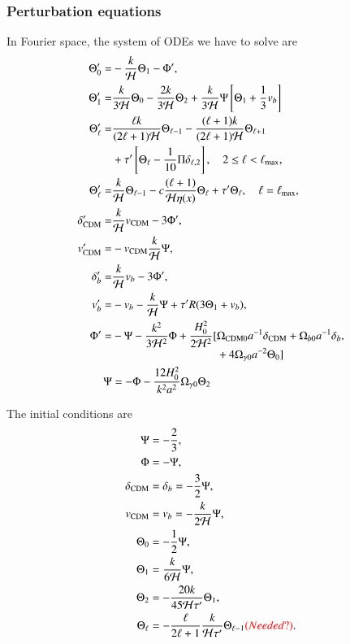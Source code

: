\subsubsection{Perturbation equations}
In Fourier space, the system of ODEs we have to solve are  
\begin{subequations}
    \begin{align}
        \Theta_0' =& - \frac{k}{\mathcal{H}}\Theta_1 - \Phi', \\
        \Theta_1' =& \frac{k}{3\mathcal{H}}\Theta_0 - \frac{2k}{3\mathcal{H}}\Theta_2 + \frac{k}{3\mathcal{H}}\Psi \left[ \Theta_1 + \frac{1}{3}v_b \right] \\ 
        \Theta_\ell' =& \frac{\ell k}{(2\ell+1)\mathcal{H}}\Theta_{\ell-1} - \frac{(\ell+1)k}{(2\ell+1)\mathcal{H}}\Theta_{\ell+1} \nonumber \\
        & + \tau'\left[ \Theta_\ell - \frac{1}{10}\Pi \delta_{\ell,2} \right],\quad 2\leq\ell<\ell_\mathrm{max}, \\
        \Theta_\ell' =& \frac{k}{\mathcal{H}}\Theta_{\ell-1} - c \frac{(\ell+1)}{\mathcal{H}\eta(x)}\Theta_{\ell} + \tau' \Theta_\ell,\quad \ell=\ell_\mathrm{max}, \\
        \delta_\mathrm{CDM}' =& \frac{k}{\mathcal{H}} v_\mathrm{CDM} - 3\Phi', \\
        v_\mathrm{CDM}' =& - v_\mathrm{CDM} \frac{k}{\mathcal{H}} \Psi, \\
        \delta_b' =& \frac{k}{\mathcal{H}} v_b - 3\Phi', \\
        v_b' =& -v_b - \frac{k}{\mathcal{H}} \Psi + \tau' R(3\Theta_1 + v_b), \\
        \Phi' =& -\Psi - \frac{k^2}{3\mathcal{H}^2}\Phi + \frac{H_0^2}{2\mathcal{H}^2} \begin{aligned}[t]
            [&\Omega_\mathrm{CDM0} a^{-1}\delta_\mathrm{CDM} + \Omega_{b0} a^{-1} \delta_b \\
            &+4\Omega_{\gamma 0} a^{-2} \Theta_0] 
            \end{aligned}, \\
        \Psi &= -\Phi - \frac{12H_0^2}{k^2 a^2} \Omega_{\gamma 0} \Theta_2
    \end{align}
\end{subequations}



The initial conditions are 
\begin{subequations}
    \begin{align}
        \Psi &= -\frac{2}{3}, \\
        \Phi &= - \Psi, \\
        \delta_\mathrm{CDM} &= \delta_b = -\frac{3}{2}\Psi, \\
        v_\mathrm{CDM} &= v_b = -\frac{k}{2\mathcal{H}} \Psi, \\
        \Theta_0 &= -\frac{1}{2}\Psi, \\
        \Theta_1 &= \frac{k}{6\mathcal{H}}\Psi, \\
        \Theta_2 &= - \frac{20k}{45\mathcal{H}\tau'}\Theta_1, \\
        \Theta_\ell &= - \frac{\ell}{2\ell+1} \frac{k}{\mathcal{H}\tau'}\Theta_{\ell-1} \textcolor{red}{(Needed?)}.
    \end{align}
\end{subequations}



